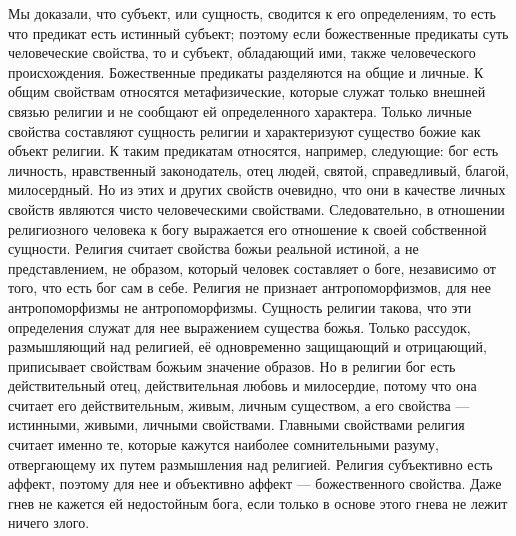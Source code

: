 \documentclass[12pt,oneside]{book}
\begin{document}
Мы доказали, что субъект, или сущность, сводится к его определениям, то есть что предикат есть истинный субъект; поэтому если божественные предикаты суть человеческие свойства, то и субъект, обладающий ими, также человеческого происхождения. Божественные предикаты разделяются на общие и личные. К общим свойствам относятся метафизические, которые служат только внешней связью религии и не сообщают ей определенного характера. Только личные свойства составляют сущность религии и характеризуют существо божие как объект религии. К таким предикатам относятся, например, следующие: бог есть личность, нравственный законодатель, отец людей, святой, справедливый, благой, милосердный. Но из этих и других свойств очевидно, что они в качестве личных свойств являются чисто человеческими свойствами. Следовательно, в отношении религиозного человека к богу выражается его отношение к своей собственной сущности. Религия считает свойства божьи реальной истиной, а не представлением, не образом, который человек составляет о боге, независимо от того, что есть бог сам в себе. Религия не признает антропоморфизмов, для нее антропоморфизмы не антропоморфизмы. Сущность религии такова, что эти определения служат для нее выражением существа божья. Только рассудок, размышляющий над религией, её одновременно защищающий и отрицающий, приписывает свойствам божьим значение образов. Но в религии бог есть действительный отец, действительная любовь и милосердие, потому что она считает его действительным, живым, личным существом, а его свойства --- истинными, живыми, личными свойствами. Главными свойствами религия считает именно те, которые кажутся наиболее сомнительными разуму, отвергающему их путем размышления над религией. Религия субъективно есть аффект, поэтому для нее и объективно аффект --- божественного свойства. Даже гнев не кажется ей недостойным бога, если только в основе этого гнева не лежит ничего злого.
\end{document}
